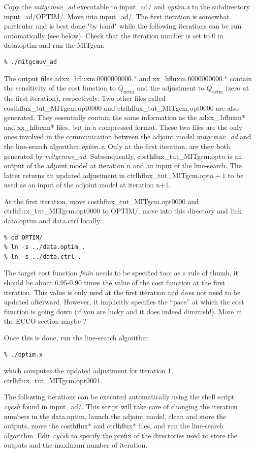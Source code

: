 Copy the {\it mitgcmuv\_ad} executable to input\_ad/ and {\it optim.x} to the
subdirectory input\_ad/OPTIM/. Move into input\_ad/. The first iteration is
somewhat particular and is best done "by hand" while the following iterations
can be run automatically (see below). Check that the iteration number is set
to 0 in data.optim and run the MITgcm:
\begin{verbatim}
% ./mitgcmuv_ad
\end{verbatim}

The output files adxx\_hfluxm.0000000000.* and xx\_hfluxm.0000000000.* contain
the sensitivity of the cost function to $Q_\mathrm{netm}$ and the adjustment
to $Q_\mathrm{netm}$ (zero at the first iteration), respectively. Two other
files called costhflux\_tut\_MITgcm.opt0000 and ctrlhflux\_tut\_MITgcm.opt0000
are also generated. They essentially contain the same information as the
adxx\_.hfluxm* and xx\_hfluxm* files, but in a compressed format. These two files
are the only ones involved in the communication between the adjoint model
{\it mitgcmuv\_ad} and the line-search algorithm {\it optim.x}. Only at the first
iteration, are they both generated by {\it mitgcmuv\_ad}. Subsenquently,
costhflux\_tut\_MITgcm.opt$n$ is an output of the adjoint model at
iteration $n$ and an input of the line-search. The latter returns an updated
adjustment in ctrlhflux\_tut\_MITgcm.opt$n+1$ to be used as an input of the
adjoint model at iteration n+1. 

At the first iteration, move costhflux\_tut\_MITgcm.opt0000 and
ctrlhflux\_tut\_MITgcm.opt0000 to OPTIM/, move into this directory and link data.optim 
and data.ctrl locally:
\begin{verbatim}
% cd OPTIM/
% ln -s ../data.optim .
% ln -s ../data.ctrl .
\end{verbatim}
The target cost function {\it fmin} needs to be specified too: as a rule of thumb,
it should be about 0.95-0.90 times the value of the cost function at
the first iteration. This value is only used at the first iteration and does
not need to be updated afterward. However, it implicitly specifies the
``pace'' at which the cost function is going down (if you are lucky and it does
indeed diminish!). More in the ECCO section maybe ?

Once this is done, run the line-search algorithm:
\begin{verbatim}
% ./optim.x
\end{verbatim}
which computes the updated adjustment for iteration 1, ctrlhflux\_tut\_MITgcm.opt0001.

The following iterations can be executed automatically using the shell
script {\it cycsh} found in input\_ad/. This script will take care of changing
the iteration numbers in the data.optim, launch the adjoint model, clean and
store the outputs, move the costhflux* and ctrlhflux* files, and run the
line-search algorithm. Edit {\it cycsh} to specify the prefix of the
directories used to store the outputs and the maximum number of iteration.

